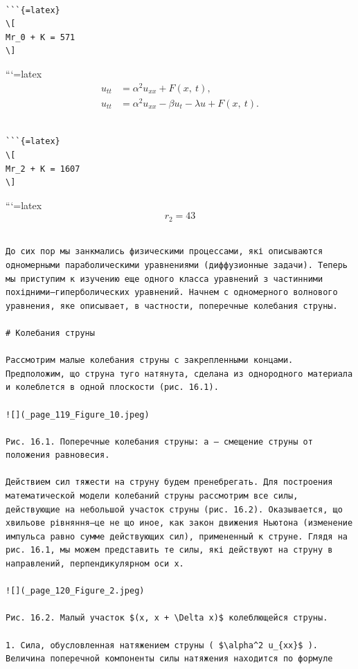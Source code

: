 \documentclass[
  ukrainian,
]{article}
\begin{document}
\begin{verbatim}

```{=latex}
\[
Mr_0 + K = 571
\]
\end{verbatim}

```{=latex}
\[
\begin{split} u_{tt} &= \alpha^2 u_{xx} + F\left(x, \ t\right), \\ u_{tt} &= \alpha^2 u_{xx} - \beta u_t - \lambda u + F\left(x, \ t\right). \end{split}
\]

\begin{verbatim}

```{=latex}
\[
Mr_2 + K = 1607
\]
\end{verbatim}

```{=latex}
\[
r_2 = 43
\]

\begin{verbatim}

До сих пор мы занкмались физическими процессами, які описываются одномерными параболическими уравнениями (диффузионные задачи). Теперь мы приступим к изучению еще одного класса уравнений з частинними похідними—гиперболических уравнений. Начнем с одномерного волнового уравнения, яке описывает, в частности, поперечные колебания струны.

# Колебания струны

Рассмотрим малые колебания струны с закрепленными концами. Предположим, що струна туго натянута, сделана из однородного материала и колеблется в одной плоскости (рис. 16.1).

![](_page_119_Figure_10.jpeg)

Рис. 16.1. Поперечные колебания струны: a — смещение струны от положения равновесия.

Действием сил тяжести на струну будем пренебрегать. Для построения математической модели колебаний струны рассмотрим все силы, действующие на небольшой участок струны (рис. 16.2). Оказывается, що хвильове рівняння—це не що иное, как закон движения Ньютона (изменение импульса равно сумме действующих сил), примененный к струне. Глядя на рис. 16.1, мы можем представить те силы, які действуют на струну в направлений, перпендикулярном оси х.

![](_page_120_Figure_2.jpeg)

Рис. 16.2. Малый участок $(x, x + \Delta x)$ колеблющейся струны.

1. Сила, обусловленная натяжением струны ( $\alpha^2 u_{xx}$ ). Величина поперечной компоненты силы натяжения находится по формуле


\end{verbatim}
\end{document}
